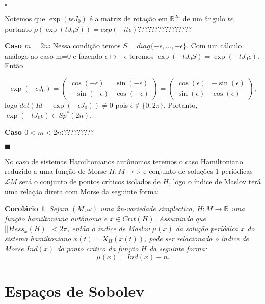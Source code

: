 \documentclass[12pt]{book}
\newtheorem{corolario}[teorema]{Corolário}
\newenvironment{prova}[1]{$\square$ #1}{\hfill$\blacksquare$}
\newcommand{\estruturacomplexa}{J_{0}}
\newcommand{\gruposimpleticonaodegenerado}[1]{Sp^{#1}(2n)}
\newcommand{\real}[1]{\mathbb{R}^{#1}}
\newcommand{\solucoesperiodicascontrateis}{\mathcal{L}M}
\begin{document}
\begin{prova}
\begin{enumerate}
			Notemos que $\exp(t\epsilon\estruturacomplexa )$ é a matriz de rotação em $\real{2n}$ de um ângulo $t\epsilon$, portanto $\rho(\exp(t\estruturacomplexa S)) = exp(-it\epsilon)????????????????$
			
			\textbf{Caso $m = 2n$:} Nessa condição temos $S = diag\{-\epsilon, \dots, -\epsilon \}$. Com um cálculo análogo ao caso m=0 e fazendo $\epsilon \mapsto -\epsilon$ teremos $\exp(-t\estruturacomplexa S) = \exp(-t\estruturacomplexa \epsilon)$. Então
			
			$$
			\exp(-\epsilon \estruturacomplexa)
			=\left(
			\begin{array}{cc}
			\cos(-\epsilon) & \sin(-\epsilon)
			\\
			-\sin(-\epsilon) & \cos(-\epsilon)
			\end{array}
			\right)
			=\left(
			\begin{array}{cc}
			\cos(\epsilon) & -\sin(\epsilon)
			\\
			\sin(\epsilon) & \cos(\epsilon)
			\end{array}
			\right),
			$$
			logo $det(Id - \exp(-\epsilon\estruturacomplexa ) ) \neq 0 $ pois $\epsilon \notin \{0,2\pi \}$. Portanto, $\exp(-t\estruturacomplexa \epsilon) \in \gruposimpleticonaodegenerado{*}$.
			
			\textbf{Caso $0<m<2n$:}?????????
		\end{enumerate}
	\end{prova}
	
	No caso de sistemas Hamiltonianos autônomos teremos o caso Hamiltoniano reduzido a uma função de Morse $H:M\to \real{}$ e conjunto de soluções 1-periódicas $\solucoesperiodicascontrateis$ será o conjunto de pontos críticos isolados de $H$, logo o índice de Maslov terá uma relação direta com Morse da seguinte forma:
	
	\begin{corolario}
		Sejam $(M, \omega)$ uma 2n-variedade simplectica, $H : M \to \real{}$ uma função hamiltoniana autônoma e $x \in Crit(H)$. Assumindo que $||Hess_{x}(H)|| < 2\pi$, então o índice de Maslov $\mu(x)$ da solução periódica $x$ do sistema hamiltoniano $\dot{x}(t) = X_{H}(x(t))$, pode ser relacionado o índice de Morse $Ind(x)$ do ponto crítico da função $H$ da seguinte forma:
		$$
		\mu(x) = Ind(x) - n.
		$$
	\end{corolario}	
	
	\chapter{Espaços de Sobolev}
\end{document}
